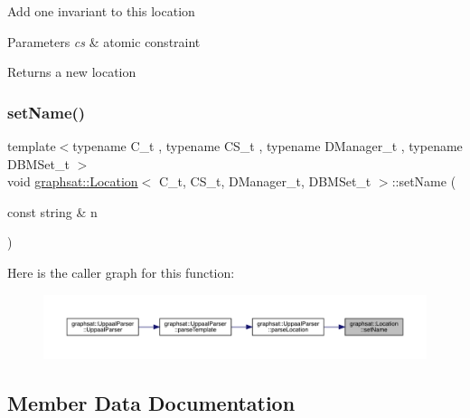 Add one invariant to this location


\begin{DoxyParams}{Parameters}
{\em cs} & atomic constraint\\
\hline
\end{DoxyParams}
\begin{DoxyReturn}{Returns}
a new location 
\end{DoxyReturn}
\mbox{\label{classgraphsat_1_1_location_ae79bd21b6d5b5ff802c0d29d7d6e09db}} 
\subsubsection{\texorpdfstring{setName()}{setName()}}
{\footnotesize\ttfamily template$<$typename C\+\_\+t , typename C\+S\+\_\+t , typename D\+Manager\+\_\+t , typename D\+B\+M\+Set\+\_\+t $>$ \\
void \mbox{\hyperlink{classgraphsat_1_1_location}{graphsat\+::\+Location}}$<$ C\+\_\+t, C\+S\+\_\+t, D\+Manager\+\_\+t, D\+B\+M\+Set\+\_\+t $>$\+::set\+Name (\begin{DoxyParamCaption}\item[{const string \&}]{n }\end{DoxyParamCaption})\hspace{0.3cm}{\ttfamily [inline]}}

Here is the caller graph for this function\+:
\nopagebreak
\begin{figure}[H]
\begin{center}
\leavevmode
\includegraphics[width=350pt]{classgraphsat_1_1_location_ae79bd21b6d5b5ff802c0d29d7d6e09db_icgraph}
\end{center}
\end{figure}


\subsection{Member Data Documentation}
\mbox{\label{classgraphsat_1_1_location_ab142fcc5402ea982f34ad075fb24c583}} 
